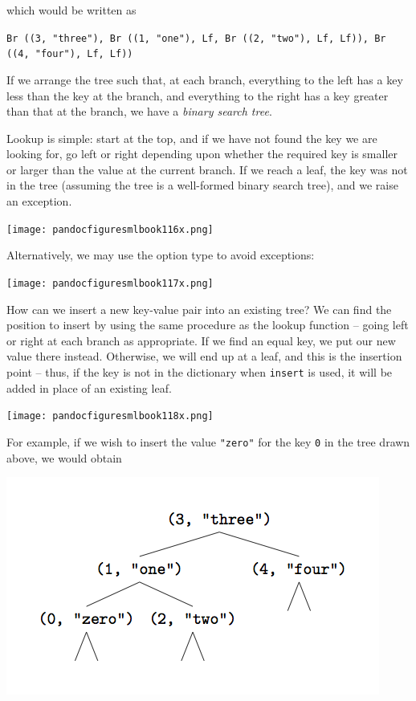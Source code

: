 \documentclass[]{book}
\newcommand{\smspace}{\vspace{4mm}}
\begin{document}
\noindent which would be written as

\smspace
{\footnotesize\texttt{Br ((3, "three"), Br ((1, "one"), Lf, Br ((2, "two"), Lf, Lf)), Br ((4, "four"), Lf, Lf))}}
\smspace

\noindent If we arrange the tree such that, at each branch, everything to the left has a key less than the key at the branch, and everything to the right has a key greater than that at the branch, we have a \textit{binary search tree}.

Lookup is simple: start at the top, and if we have not found the key we are looking for, go left or right depending upon whether the required key is smaller or larger than the value at the current branch. If we reach a leaf, the key was not in the tree (assuming the tree is a well-formed binary search tree), and we raise an exception.

\medskip
\begin{center}
\noindent\texttt{[image: pandocfiguresmlbook116x.png]}
\end{center}
\medskip

\noindent Alternatively, we may use the \textsf{option} type to avoid exceptions:

\medskip
\begin{center}
\noindent\texttt{[image: pandocfiguresmlbook117x.png]}
\end{center}
\medskip

\noindent How can we insert a new key-value pair into an existing tree? We can find the position to insert by using the same procedure as the lookup function -- going left or right at each branch as appropriate. If we find an equal key, we put our new value there instead. Otherwise, we will end up at a leaf, and this is the insertion point -- thus, if the key is not in the dictionary when \texttt{insert} is used, it will be added in place of an existing leaf.

\medskip
\begin{center}
\noindent\texttt{[image: pandocfiguresmlbook118x.png]}
\end{center}
\medskip

\noindent For example, if we wish to insert the value \texttt{"zero"} for the key \texttt{0} in the tree drawn above, we would obtain

\smspace
\includegraphics{kindlefig5.png}
\smspace
\end{document}

